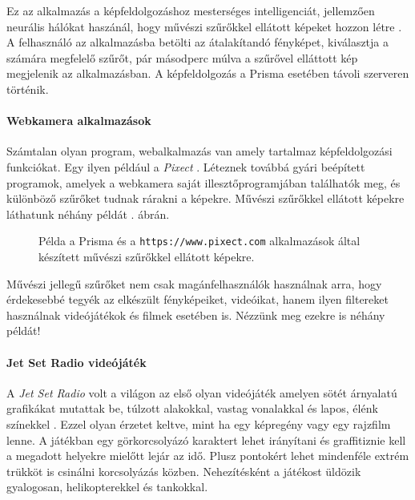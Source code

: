 Ez az alkalmazás a képfeldolgozáshoz mesterséges intelligenciát, jellemzően neurális hálókat haszánál, hogy művészi szűrőkkel ellátott képeket hozzon létre \cite{prisma}. A felhasználó az alkalmazásba betölti az átalakítandó fényképet, kiválasztja a számára megfelelő szűrőt, pár másodperc múlva a szűrővel elláttott kép megjelenik az alkalmazásban. A képfeldolgozás a Prisma esetében távoli szerveren történik.

\paragraph{Webkamera alkalmazások} 

Számtalan olyan program, webalkalmazás van amely tartalmaz képfeldolgozási funkciókat. Egy ilyen például a \textit{Pixect} \cite{pixect}. Léteznek továbbá gyári beépített programok, amelyek a webkamera saját illesztőprogramjában találhatók meg, és különböző szűrőket tudnak rárakni a képekre. Művészi szűrőkkel ellátott képekre láthatunk néhány példát . ábrán.

\begin{figure}[ht]
\centering
{}
\caption{Példa a Prisma és a \texttt{https://www.pixect.com} alkalmazások által készített művészi szűrőkkel ellátott képekre.} 
\label{fig:prisma}
\end{figure}


Művészi jellegű szűrőket nem csak magánfelhasználók használnak arra, hogy érdekesebbé tegyék az elkészült fényképeiket, videóikat, hanem ilyen filtereket használnak videójátékok és filmek esetében is. Nézzünk meg ezekre is néhány példát!

\paragraph{Jet Set Radio videójáték} 

A \textit{Jet Set Radio} volt a világon az első olyan videójáték amelyen sötét árnyalatú grafikákat mutattak be, túlzott alakokkal, vastag vonalakkal és lapos, élénk színekkel \cite{jetset}. Ezzel olyan érzetet keltve, mint ha egy képregény vagy egy rajzfilm lenne. A játékban egy görkorcsolyázó karaktert lehet irányítani és graffitiznie kell a megadott helyekre mielőtt lejár az idő. Plusz pontokért lehet mindenféle extrém trükköt is csinálni korcsolyázás közben. Nehezítésként a játékost üldözik gyalogosan, helikopterekkel és tankokkal.

